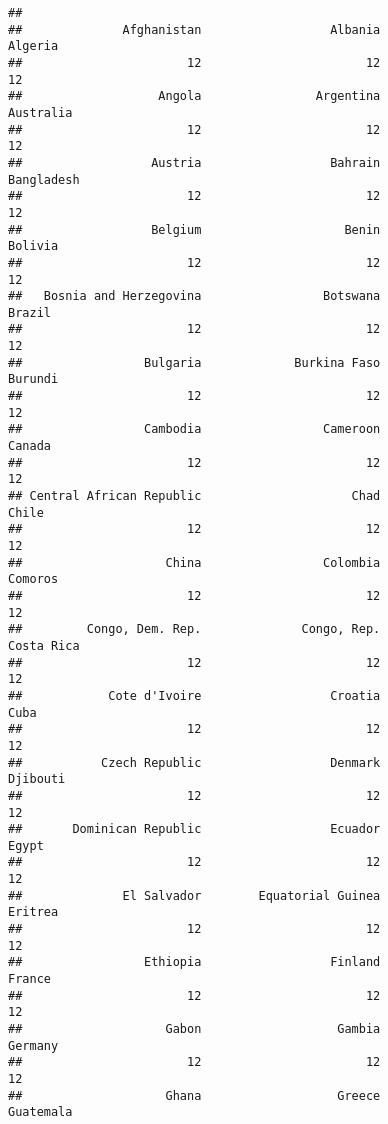 \documentclass[
]{book}
\begin{document}
\begin{verbatim}
## 
##              Afghanistan                  Albania                  Algeria 
##                       12                       12                       12 
##                   Angola                Argentina                Australia 
##                       12                       12                       12 
##                  Austria                  Bahrain               Bangladesh 
##                       12                       12                       12 
##                  Belgium                    Benin                  Bolivia 
##                       12                       12                       12 
##   Bosnia and Herzegovina                 Botswana                   Brazil 
##                       12                       12                       12 
##                 Bulgaria             Burkina Faso                  Burundi 
##                       12                       12                       12 
##                 Cambodia                 Cameroon                   Canada 
##                       12                       12                       12 
## Central African Republic                     Chad                    Chile 
##                       12                       12                       12 
##                    China                 Colombia                  Comoros 
##                       12                       12                       12 
##         Congo, Dem. Rep.              Congo, Rep.               Costa Rica 
##                       12                       12                       12 
##            Cote d'Ivoire                  Croatia                     Cuba 
##                       12                       12                       12 
##           Czech Republic                  Denmark                 Djibouti 
##                       12                       12                       12 
##       Dominican Republic                  Ecuador                    Egypt 
##                       12                       12                       12 
##              El Salvador        Equatorial Guinea                  Eritrea 
##                       12                       12                       12 
##                 Ethiopia                  Finland                   France 
##                       12                       12                       12 
##                    Gabon                   Gambia                  Germany 
##                       12                       12                       12 
##                    Ghana                   Greece                Guatemala 

\end{verbatim}
\end{document}
